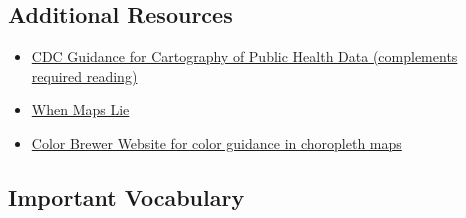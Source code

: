 \documentclass[
]{book}
\providecommand{\tightlist}{%
  \setlength{\itemsep}{0pt}\setlength{\parskip}{0pt}}
\begin{document}
\hypertarget{additional-resources-1}{%
\subsection{Additional Resources}\label{additional-resources-1}}

\begin{itemize}
\tightlist
\item
  \href{https://www.cdc.gov/dhdsp/maps/gisx/resources/tips-creating-ph-maps.html}{CDC Guidance for Cartography of Public Health Data (complements required reading)}
\item
  \href{https://www.citylab.com/design/2015/06/when-maps-lie/396761/}{When Maps Lie}
\item
  \href{http://colorbrewer2.org/\#}{Color Brewer Website for color guidance in choropleth maps}
\end{itemize}

\hypertarget{important-vocabulary-1}{%
\subsection{Important Vocabulary}\label{important-vocabulary-1}}

 
  \providecommand{\huxb}[2]{\arrayrulecolor[RGB]{#1}\global\arrayrulewidth=#2pt}
  \providecommand{\huxvb}[2]{\color[RGB]{#1}\vrule width #2pt}
  \providecommand{\huxtpad}[1]{\rule{0pt}{#1}}
  \providecommand{\huxbpad}[1]{\rule[-#1]{0pt}{#1}}
\end{document}
